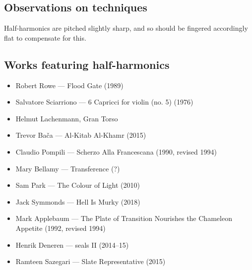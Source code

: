 \subsection{Observations on techniques}
Half-harmonics are pitched slightly sharp, and so should be fingered accordingly flat to compensate for this.\autocite[113]{welbanksFoundationsModernCello}

\subsection{Works featuring half-harmonics}\label{sec:half-harmonicsLiterature}

\begin{itemize}
    \item Robert Rowe --- Flood Gate (1989)
    \item Salvatore Sciarriono --- 6 Capricci for violin (no. 5) (1976) 
    \item Helmut Lachenmann, Gran Torso
    \item Trevor Bača --- Al-Kitab Al-Khamr (2015)
    \item Claudio Pompili --- Scherzo Alla Francescana (1990, revised 1994)
    \item Mary Bellamy --- Transference (?)
    \item Sam Park --- The Colour of Light (2010)
    \item Jack Symmonds --- Hell Is Murky (2018)
    \item Mark Applebaum --- The Plate of Transition Nourishes the Chameleon Appetite (1992, revised 1994)
    \item Henrik Deneren --- seals II (2014--15)
    \item Ramteen Sazegari --- Slate Representative (2015)
\end{itemize}